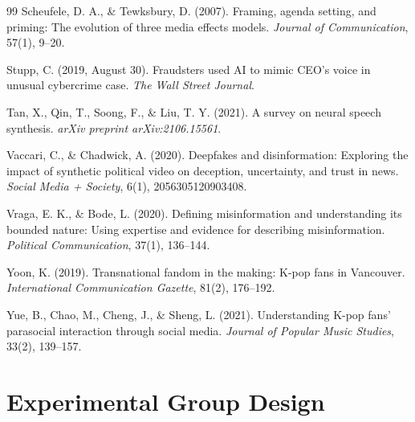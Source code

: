 \documentclass[12pt, a4paper]{article}
\begin{document}
\begin{thebibliography}{99}
Scheufele, D. A., \& Tewksbury, D. (2007). Framing, agenda setting, and priming: The evolution of three media effects models. \textit{Journal of Communication}, 57(1), 9--20.

Stupp, C. (2019, August 30). Fraudsters used AI to mimic CEO's voice in unusual cybercrime case. \textit{The Wall Street Journal}.

Tan, X., Qin, T., Soong, F., \& Liu, T. Y. (2021). A survey on neural speech synthesis. \textit{arXiv preprint arXiv:2106.15561}.

Vaccari, C., \& Chadwick, A. (2020). Deepfakes and disinformation: Exploring the impact of synthetic political video on deception, uncertainty, and trust in news. \textit{Social Media + Society}, 6(1), 2056305120903408.

Vraga, E. K., \& Bode, L. (2020). Defining misinformation and understanding its bounded nature: Using expertise and evidence for describing misinformation. \textit{Political Communication}, 37(1), 136--144.

Yoon, K. (2019). Transnational fandom in the making: K-pop fans in Vancouver. \textit{International Communication Gazette}, 81(2), 176--192.

Yue, B., Chao, M., Cheng, J., \& Sheng, L. (2021). Understanding K-pop fans' parasocial interaction through social media. \textit{Journal of Popular Music Studies}, 33(2), 139--157.

\end{thebibliography}


\newpage
\appendix

\section{Experimental Group Design}
\end{document}

